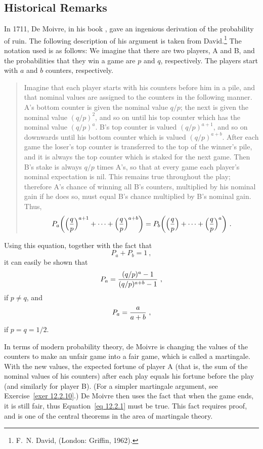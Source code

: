 \subsection*{Historical Remarks}

In 1711, De Moivre, in his book  , gave an ingenious
derivation of the probability of ruin.  The following description of his argument is taken from
David.\footnote{F.~N. David, 
 (London: Griffin, 1962).}  The notation used
is as follows:  We imagine that there are two players, A and B, and the probabilities that they
win a game are $p$ and $q$, respectively.  The players start with $a$ and $b$ counters,
respectively. 
\begin{quote}
Imagine that each player starts with his counters before him in a pile, and that nominal values
are assigned to the counters in the following manner.  A's bottom counter is given the nominal
value $q/p$; the next is given the nominal value $(q/p)^2$, and so on until his top counter
which has the nominal value $(q/p)^a$.  B's top counter is valued $(q/p)^{a+1}$, and so on
downwards until his bottom counter which is valued $(q/p)^{a+b}$.  After each game the loser's
top counter is transferred to the top of the winner's pile, and it is always the top counter
which is staked for the next game.  Then  B's stake is
always $q/p$ times A's, so that at every game each player's nominal expectation is nil.  This
remains true throughout the play; therefore A's chance of winning all B's counters, multiplied
by his nominal gain if he does so, must equal B's chance multiplied by B's nominal gain.  Thus,
\begin{equation}
P_a\biggl(\Bigl({q\over p}\Bigr)^{a+1} + \cdots +
\Bigl({q\over p}\Bigr)^{a+b}\biggr) =  
P_b\biggl(\Bigl({q\over p}\Bigr) + \cdots +
\Bigl({q\over p}\Bigr)^a\biggr)\ .
\label{eq 12.2.1}
\end{equation}
\end{quote}
\par
Using this equation, together with the fact that
$$P_a + P_b = 1\ ,$$
it can easily be shown that
$$P_a = {{(q/p)^a - 1}\over{(q/p)^{a+b} - 1}}\ ,$$
if $p \ne q$, and
$$P_a = {a\over{a+b}}\ ,$$
if $p = q = 1/2$.
\par
In terms of modern probability theory, de Moivre is changing the values of the counters to make
an unfair game into a fair game, which is called a martingale.  With the new values, the
expected fortune of player A (that is, the sum of the nominal values of his counters) after each
play equals his fortune before the play (and similarly for player B).  (For a simpler martingale
argument, see Exercise~\ref{exer 12.2.10}.)  De Moivre then uses the fact that when the game ends,
it is still fair, thus Equation~\ref{eq 12.2.1} must be true.  This fact requires proof, and is
one of the central theorems in the area of martingale theory.  

